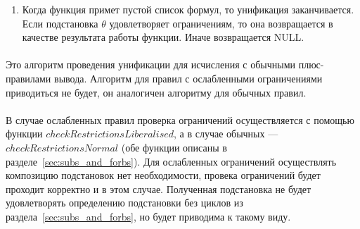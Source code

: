 \documentclass{cw1}
\begin{document}
\begin{enumerate}
 \item Когда функция примет пустой список формул, то унификация заканчивается. Если подстановка
 $\theta$ удовлетворяет ограничениям, то она возвращается в качестве результата работы функции.
 Иначе возвращается NULL.
\end{enumerate}

\paragraph{}
Это алгоритм проведения унификации для исчисления с обычными плюс-правилами вывода. Алгоритм
для правил с ослабленными ограничениями приводиться не будет, он аналогичен алгоритму для
обычных правил.
\paragraph{}
В случае ослабленных правил проверка ограничений осуществляется с помощью функции
$checkRestrictionsLiberalised$, а в случае обычных --- $checkRestrictionsNormal$ (обе функции описаны
в разделе~\ref{sec:subs_and_forbs}). Для ослабленных ограничений осуществлять композицию подстановок
нет необходимости, провека ограничений будет проходит корректно и в этом случае. Полученная
подстановка не будет удовлетворять определению подстановки без циклов из раздела~\ref{sec:subs_and_forbs},
но будет приводима к такому виду.
% 
\end{document}
